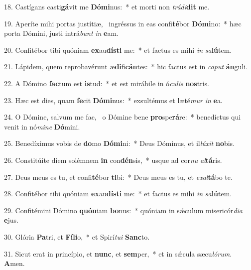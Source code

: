 18. Castígans casti\textbf{gá}vit me \textbf{Dó}\textbf{mi}nus:~*  et morti non \textit{trá}\textit{di}\textbf{dit} me.\

19. Aperíte mihi portas justítiæ, \dag\  ingréssus in eas confi\textbf{té}bor \textbf{Dó}\textbf{mi}no:~*  hæc porta Dómini, justi intrá\textit{bunt} \textit{in} \textbf{e}am.\

20. Confitébor tibi quóniam \textbf{ex}au\textbf{dís}\textbf{ti} me:~*  et factus es mihi \textit{in} \textit{sa}\textbf{lú}tem.\

21. Lápidem, quem reprobavérunt æ\textbf{di}fi\textbf{cán}tes:~*  hic factus est in \textit{ca}\textit{put} \textbf{án}guli.\

22. A Dómino \textbf{fac}tum est \textbf{is}tud:~*  et est mirábile in ó\textit{cu}\textit{lis} \textbf{nos}tris.\

23. Hæc est dies, quam \textbf{fe}cit \textbf{Dó}\textbf{mi}nus:~*  exsultémus et læté\textit{mur} \textit{in} \textbf{e}a.\

24. O Dómine, salvum me fac, \dag\  o Dómine bene \textbf{pro}spe\textbf{rá}re:~*  benedíctus qui venit in nó\textit{mi}\textit{ne} \textbf{Dó}mini.\

25. Benedíximus vobis de \textbf{do}mo \textbf{Dó}\textbf{mi}ni:~*  Deus Dóminus, et il\textit{lú}\textit{xit} \textbf{no}bis.\

26. Constitúite diem solémnem \textbf{in} con\textbf{dén}sis,~*  usque ad cor\textit{nu} \textit{al}\textbf{tá}ris.\

27. Deus meus es tu, et confi\textbf{té}bor \textbf{ti}bi:~*  Deus meus es tu, et \textit{ex}\textit{al}\textbf{tá}bo te.\

28. Confitébor tibi quóniam \textbf{ex}au\textbf{dís}\textbf{ti} me:~*  et factus es mihi \textit{in} \textit{sa}\textbf{lú}tem.\

29. Confitémini Dómino \textbf{quón}iam \textbf{bo}nus:~*  quóniam in sǽculum misericór\textit{di}\textit{a} \textbf{e}jus.\

30. Glória \textbf{Pa}tri, et \textbf{Fí}\textbf{li}o,~*  et Spirí\textit{tu}\textit{i} \textbf{Sanc}to.\

31. Sicut erat in princípio, et \textbf{nunc}, et \textbf{sem}per,~*  et in sǽcula sæcu\textit{ló}\textit{rum}. \textbf{A}men.\

